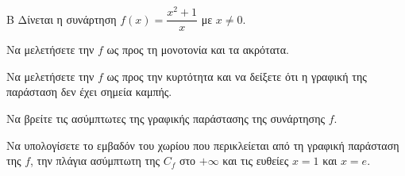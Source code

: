 \begin{thema}{Β}
Δίνεται η συνάρτηση $f(x) = \dfrac{x^2+1}{x}$ με $x \ne 0$.
\begin{erwthma}
\item Να μελετήσετε την $f$ ως προς τη μονοτονία και τα ακρότατα.
\item Να μελετήσετε την $f$ ως προς την κυρτότητα και να δείξετε ότι η γραφική της παράσταση δεν έχει σημεία καμπής.
\item Να βρείτε τις ασύμπτωτες της γραφικής παράστασης της συνάρτησης $f$.
\item Να υπολογίσετε το εμβαδόν του χωρίου που περικλείεται από τη γραφική παράσταση της $f$, την πλάγια ασύμπτωτη της $C_f$ στο $+\infty$ και τις ευθείες $x=1$ και $x=e$.
\end{erwthma}
\end{thema}
